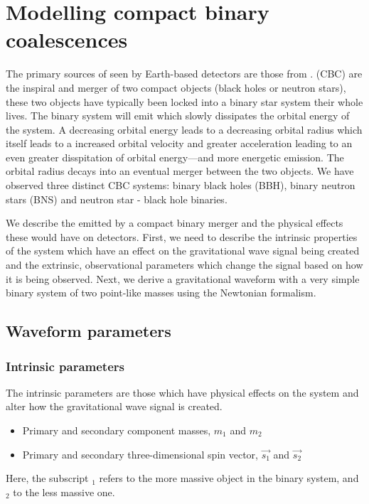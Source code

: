 \section{\label{1:sec:modelling_CBC}Modelling compact binary coalescences}

The primary sources of \gws seen by Earth-based \gwadj detectors are those from \cbcs. \Cbcs (CBC) are the inspiral and merger of two compact objects (black holes or neutron stars), these two objects have typically been locked into a binary star system their whole lives. The binary system will emit \gws which slowly dissipates the orbital energy of the system. A decreasing orbital energy leads to a decreasing orbital radius which itself leads to a increased orbital velocity and greater acceleration leading to an even greater disspitation of orbital energy---and more energetic \gwadj emission. The orbital radius decays into an eventual merger between the two objects. We have observed three distinct CBC systems: binary black holes (BBH), binary neutron stars (BNS) and neutron star - black hole binaries. 

We describe the \gws emitted by a compact binary merger and the physical effects these would have on \gwadj detectors. First, we need to describe the intrinsic properties of the system which have an effect on the gravitational wave signal being created and the extrinsic, observational parameters which change the signal based on how it is being observed. Next, we derive a gravitational waveform with a very simple binary system of two point-like masses using the Newtonian formalism.

\subsection{\label{1:sec:CBC-parameters}Waveform parameters}

\subsubsection{Intrinsic parameters}
The intrinsic parameters are those which have physical effects on the system and alter how the gravitational wave signal is created.
\begin{itemize}
   \item Primary and secondary component masses, $m_{1}$ and $m_{2}$
   \item Primary and secondary three-dimensional spin vector, $\vec{s_{1}}$ and $\vec{s_{2}}$
\end{itemize}
Here, the subscript $_1$ refers to the more massive object in the binary system, and $_2$ to the less massive one.

